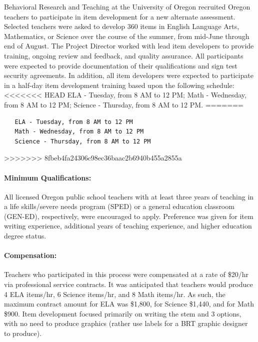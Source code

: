 \documentclass[]{article}
\let\oldparagraph\paragraph
\renewcommand{\paragraph}[1]{\oldparagraph{#1}\mbox{}}
\begin{document}
Behavioral Research and Teaching at the University of Oregon recruited
Oregon teachers to participate in item development for a new alternate
assessment. Selected teachers were asked to develop 360 items in English
Language Arts, Mathematics, or Science over the course of the summer,
from mid-June through end of August. The Project Director worked with
lead item developers to provide training, ongoing review and feedback,
and quality assurance. All participants were expected to provide
documentation of their qualifications and sign test security agreements.
In addition, all item developers were expected to participate in a
half-day item development training based upon the following schedule:
<<<<<<< HEAD
ELA - Tuesday, from 8 AM to 12 PM; Math - Wednesday, from 8 AM to 12 PM;
Science - Thursday, from 8 AM to 12 PM.
=======

\begin{verbatim}
   ELA - Tuesday, from 8 AM to 12 PM 
   Math - Wednesday, from 8 AM to 12 PM 
   Science - Thursday, from 8 AM to 12 PM
\end{verbatim}
>>>>>>> 8fbeb4fa24306c98ec36baac2b6940b455a2855a

\paragraph{Minimum Qualifications:}\label{minimum-qualifications}

All licensed Oregon public school teachers with at least three years of
teaching in a life skills/severe needs program (SPED) or a general
education classroom (GEN-ED), respectively, were encouraged to apply.
Preference was given for item writing experience, additional years of
teaching experience, and higher education degree status.

\paragraph{Compensation:}\label{compensation}

Teachers who participated in this process were compensated at a rate of
\$20/hr via professional service contracts. It was anticipated that
teachers would produce 4 ELA items/hr, 6 Science items/hr, and 8 Math
items/hr. As such, the maximum contract amount for ELA was \$1,800, for
Science \$1,440, and for Math \$900. Item development focused primarily
on writing the stem and 3 options, with no need to produce graphics
(rather use labels for a BRT graphic designer to produce).
\end{document}
